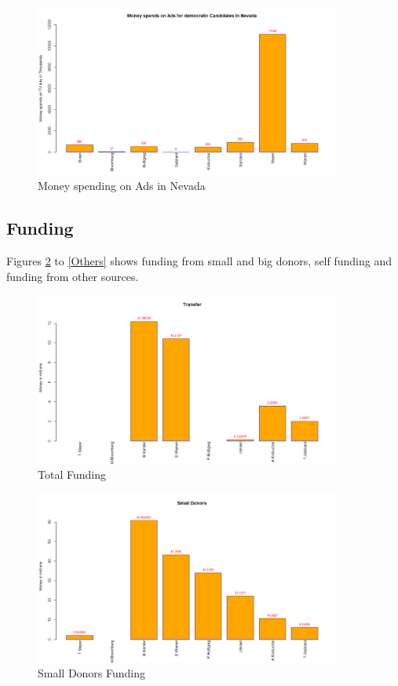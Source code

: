 \begin{figure}[H]
    \centering
    \includegraphics[width=0.9\textwidth]{figures/Nevada.png}
    \caption{Money spending on Ads in Nevada}
    \label{Nevada}
\end{figure}

\subsection{Funding}
Figures \ref{Total} to \ref{Others} shows funding from small and big donors,  self funding and funding from other sources.  
\begin{figure}[H]
    \centering
    \includegraphics[width=0.9\textwidth]{figures/Total.png}
    \caption{Total Funding}
    \label{Total}
\end{figure}

\begin{figure}[H]
    \centering
    \includegraphics[width=0.9\textwidth]{figures/Small Donors.png}
    \caption{Small Donors Funding}
    \label{Small Donors}
\end{figure}


